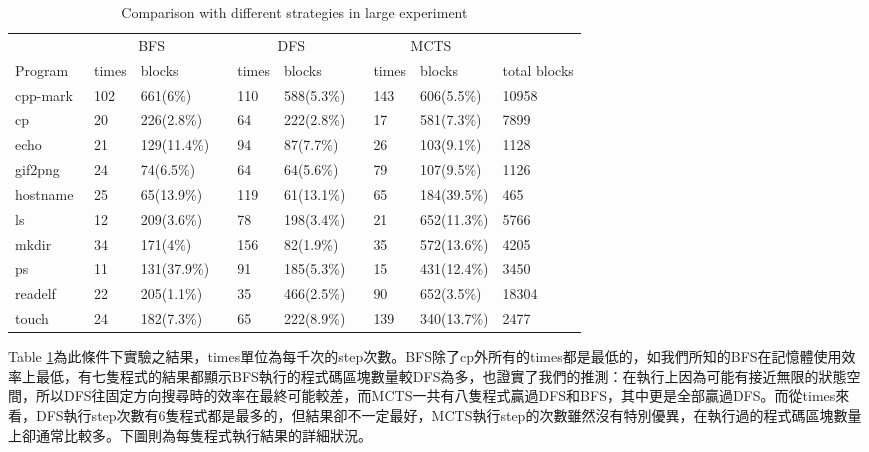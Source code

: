\documentclass[12pt,a4paper,oneside]{book}
\begin{document}
\begin{table}[htbp]
\centering
\caption{Comparison with different strategies in large experiment}
\label{large_sum}
\begin{tabular}{@{}llllllllll@{}} \toprule
             & \multicolumn{2}{c}{BFS} & \phantom{abc} & \multicolumn{2}{c}{DFS} & \phantom{abc} & \multicolumn{2}{c}{MCTS}  &  \\ \cmidrule{2-3} \cmidrule{5-6} \cmidrule{8-9}
Program      & times & blocks & & times & blocks & & times & blocks & total blocks  \\ \midrule
cpp-mark~    & 102   & 661(6\%)    & &  110  &  588(5.3\%)   & &  143  & 606(5.5\%)    & 10958         \\
cp           &  20   & 226(2.8\%)    & &   64  &  222(2.8\%)   & &   17  & 581(7.3\%)    &  7899         \\ 
echo         &  21   & 129(11.4\%)    & &   94  &   87(7.7\%)   & &   26  & 103(9.1\%)    &  1128         \\
gif2png      &  24   &  74(6.5\%)    & &   64  &   64(5.6\%)   & &   79  & 107(9.5\%)    &  1126         \\
hostname     &  25   &  65(13.9\%)    & &  119  &   61(13.1\%)   & &   65  & 184(39.5\%)    &   465         \\
ls           &  12   & 209(3.6\%)    & &   78  &  198(3.4\%)   & &   21  & 652(11.3\%)    &  5766         \\
mkdir        &  34   & 171(4\%)    & &  156  &   82(1.9\%)   & &   35  & 572(13.6\%)    &  4205         \\
ps           &  11   & 131(37.9\%)    & &   91  &  185(5.3\%)   & &   15  & 431(12.4\%)    &  3450         \\
readelf      &  22   & 205(1.1\%)    & &   35  &  466(2.5\%)   & &   90  & 652(3.5\%)    & 18304         \\
touch        &  24   & 182(7.3\%)    & &   65  &  222(8.9\%)   & &  139  & 340(13.7\%)    &  2477         \\ \bottomrule
\end{tabular}
\end{table}

Table \ref{large_sum}為此條件下實驗之結果，times單位為每千次的step次數。BFS除了cp外所有的times都是最低的，如我們所知的BFS在記憶體使用效率上最低，有七隻程式的結果都顯示BFS執行的程式碼區塊數量較DFS為多，也證實了我們的推測：在執行上因為可能有接近無限的狀態空間，所以DFS往固定方向搜尋時的效率在最終可能較差，而MCTS一共有八隻程式贏過DFS和BFS，其中更是全部贏過DFS。而從times來看，DFS執行step次數有6隻程式都是最多的，但結果卻不一定最好，MCTS執行step的次數雖然沒有特別優異，在執行過的程式碼區塊數量上卻通常比較多。下圖則為每隻程式執行結果的詳細狀況。
\end{document}
